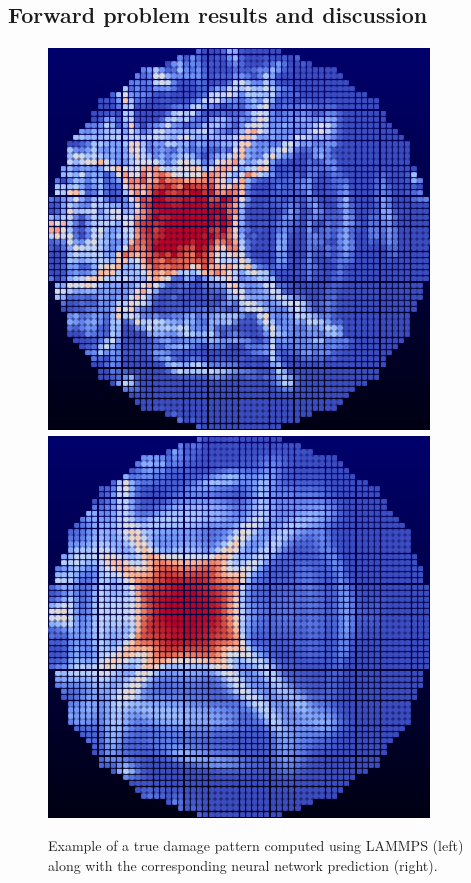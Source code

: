 \subsection{Forward problem results and discussion}
\label{forward_results}

\begin{figure}
  \centering
  \includegraphics[scale=1.1]{figure/New_Solutions/soln_19050.eps}
  \includegraphics[scale=1.1]{figure/New_Solutions/pred_19050.eps}
\caption{Example of a true damage pattern computed using LAMMPS (left) along with the corresponding neural network prediction (right).}
\label{fig:forward_results}       
\end{figure}


